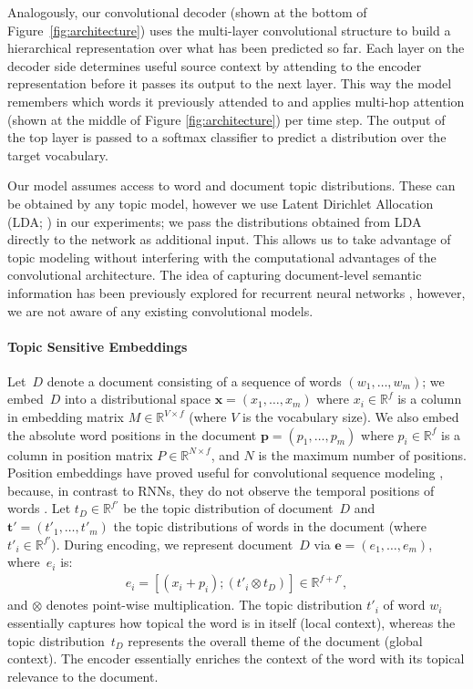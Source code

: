 Analogously, our convolutional decoder (shown at the bottom of
Figure~\ref{fig:architecture}) uses the multi-layer convolutional
structure to build a hierarchical representation over what has been
predicted so far. Each layer on the decoder side determines useful
source context by attending to the encoder representation before it
passes its output to the next layer. This way the model remembers
which words it previously attended to and applies multi-hop attention
(shown at the middle of Figure \ref{fig:architecture}) per time
step. The output of the top layer is passed to a softmax classifier to
predict a distribution over the target vocabulary.


Our model assumes access to word and document topic
distributions. These can be obtained by any topic model, however we
use Latent Dirichlet Allocation (LDA; \citealt{Blei:2003:LDA}) in our
experiments; we pass the distributions obtained from LDA directly to
the network as additional input. This allows us to take advantage of
topic modeling without interfering with the computational advantages
of the convolutional architecture. The idea of capturing
document-level semantic information has been previously explored for
recurrent neural networks
\cite{mikolovZ12,Ghosh2016ContextualL,dieng-iclr17}, however, we are
not aware of any existing convolutional models.


\paragraph{Topic Sensitive Embeddings}

Let~$D$ denote a document consisting of a sequence of words $(w_1,
\ldots, w_m)$; we embed~$D$ into a distributional space $\mathbf{x} =
(x_1, \ldots, x_m)$ where $x_i \in \mathbb{R}^f$ is a column in
embedding matrix $M \in \mathbb{R}^{V\times f}$ (where $V$ is the
vocabulary size). We also embed the absolute word positions in the
document \mbox{$\mathbf{p} = (p_1, \ldots, p_m)$} where $p_i \in
\mathbb{R}^f$ is a column in position matrix $P \in
\mathbb{R}^{N\times f}$, and $N$ is the maximum number of
positions. Position embeddings have proved useful for convolutional
sequence modeling \cite{convseq2seq}, because, in contrast to RNNs,
they do not observe the temporal positions of words
\cite{D16-1248}. Let $t_D \in \mathbb{R}^{f'}$ be the topic
distribution of document~$D$ and $\mathbf{t'} = (t'_1, \ldots, t'_m)$
the topic distributions of words in the document (where $t'_i \in
\mathbb{R}^{f'}$). During encoding, we represent document~$D$ via
$\mathbf{e} = (e_1, \ldots, e_m)$, where~$e_i$ is:
\begin{align}
e_i = [(x_i+p_i);(t'_i\otimes t_D)] \in \mathbb{R}^{f+f'}, \label{eq:encoder}
\end{align}
\noindent and $\otimes$ denotes point-wise multiplication. The topic
distribution $t'_i$ of word $w_i$ essentially captures how topical the
word is in itself (local context), whereas the topic
distribution~$t_D$ represents the overall theme of the document
(global context). The encoder essentially enriches the context of the
word with its topical relevance to the document.


